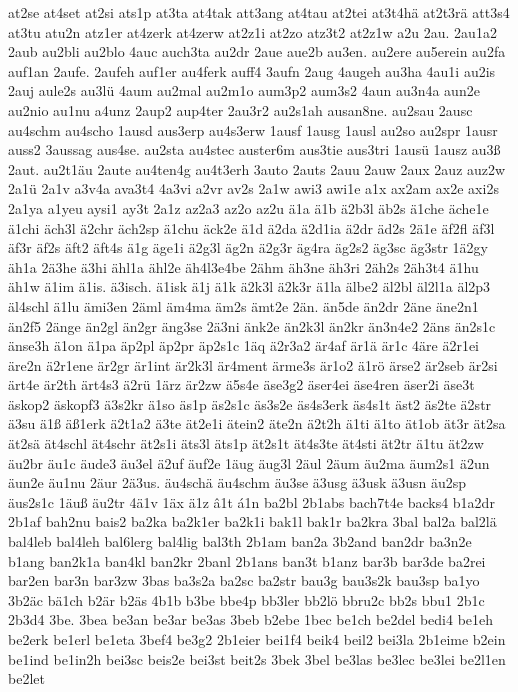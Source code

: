 {at2se
at4set
at2si
ats1p
at3ta
at4tak
att3ang
at4tau
at2tei
at3t4hä
at2t3rä
att3s4
at3tu
atu2n
atz1er
at4zerk
at4zerw
at2z1i
at2zo
atz3t2
at2z1w
a2u
2au.
2au1a2
2aub
au2bli
au2blo
4auc
auch3ta
au2dr
2aue
aue2b
au3en.
au2ere
au5erein
au2fa
auf1an
2aufe.
2aufeh
auf1er
au4ferk
auff4
3aufn
2aug
4augeh
au3ha
4au1i
au2is
2auj
aule2s
au3lü
4aum
au2mal
au2m1o
aum3p2
aum3s2
4aun
au3n4a
aun2e
au2nio
au1nu
a4unz
2aup2
aup4ter
2au3r2
au2s1ah
ausan8ne.
au2sau
2ausc
au4schm
au4scho
1ausd
aus3erp
au4s3erw
1ausf
1ausg
1ausl
au2so
au2spr
1ausr
auss2
3aussag
aus4se.
au2sta
au4stec
auster6m
aus3tie
aus3tri
1ausü
1ausz
au3ß
2aut.
au2t1äu
2aute
au4ten4g
au4t3erh
3auto
2auts
2auu
2auw
2aux
2auz
auz2w
2a1ü
2a1v
a3v4a
ava3t4
4a3vi
a2vr
av2s
2a1w
awi3
awi1e
a1x
ax2am
ax2e
axi2s
2a1ya
a1yeu
aysi1
ay3t
2a1z
az2a3
az2o
az2u
ä1a
ä1b
ä2b3l
äb2s
ä1che
äche1e
ä1chi
äch3l
ä2chr
äch2sp
ä1chu
äck2e
ä1d
ä2da
ä2d1ia
ä2dr
äd2s
2ä1e
äf2fl
äf3l
äf3r
äf2s
äft2
äft4s
ä1g
äge1i
ä2g3l
äg2n
ä2g3r
äg4ra
äg2s2
äg3sc
äg3str
1ä2gy
äh1a
2ä3he
ä3hi
ähl1a
ähl2e
äh4l3e4be
2ähm
äh3ne
äh3ri
2äh2s
2äh3t4
ä1hu
äh1w
ä1im
ä1is.
ä3isch.
ä1isk
ä1j
ä1k
ä2k3l
ä2k3r
ä1la
älbe2
äl2bl
äl2l1a
äl2p3
äl4schl
ä1lu
ämi3en
2äml
äm4ma
äm2s
ämt2e
2än.
än5de
än2dr
2äne
äne2n1
än2f5
2änge
än2gl
än2gr
äng3se
2ä3ni
änk2e
än2k3l
än2kr
än3n4e2
2äns
än2s1c
änse3h
ä1on
ä1pa
äp2pl
äp2pr
äp2s1c
1äq
ä2r3a2
är4af
är1ä
är1c
4äre
ä2r1ei
äre2n
ä2r1ene
är2gr
är1int
är2k3l
är4ment
ärme3s
är1o2
ä1rö
ärse2
är2seb
är2si
ärt4e
är2th
ärt4s3
ä2rü
1ärz
är2zw
ä5s4e
äse3g2
äser4ei
äse4ren
äser2i
äse3t
äskop2
äskopf3
ä3s2kr
ä1so
äs1p
äs2s1c
äs3s2e
äs4s3erk
äs4s1t
äst2
äs2te
ä2str
ä3su
ä1ß
äß1erk
ä2t1a2
ä3te
ät2e1i
ätein2
äte2n
ä2t2h
ä1ti
ä1to
ät1ob
ät3r
ät2sa
ät2sä
ät4schl
ät4schr
ät2s1i
äts3l
äts1p
ät2s1t
ät4s3te
ät4sti
ät2tr
ä1tu
ät2zw
äu2br
äu1c
äude3
äu3el
ä2uf
äuf2e
1äug
äug3l
2äul
2äum
äu2ma
äum2s1
ä2un
äun2e
äu1nu
2äur
2ä3us.
äu4schä
äu4schm
äu3se
ä3usg
ä3usk
ä3usn
äu2sp
äus2s1c
1äuß
äu2tr
4ä1v
1äx
ä1z
â1t
á1n
ba2bl
2b1abs
bach7t4e
backs4
b1a2dr
2b1af
bah2nu
bais2
ba2ka
ba2k1er
ba2k1i
bak1l
bak1r
ba2kra
3bal
bal2a
bal2lä
bal4leb
bal4leh
bal6lerg
bal4lig
bal3th
2b1am
ban2a
3b2and
ban2dr
ba3n2e
b1ang
ban2k1a
ban4kl
ban2kr
2banl
2b1ans
ban3t
b1anz
bar3b
bar3de
ba2rei
bar2en
bar3n
bar3zw
3bas
ba3s2a
ba2sc
ba2str
bau3g
bau3s2k
bau3sp
ba1yo
3b2äc
bä1ch
b2är
b2äs
4b1b
b3be
bbe4p
bb3ler
bb2lö
bbru2c
bb2s
bbu1
2b1c
2b3d4
3be.
3bea
be3an
be3ar
be3as
3beb
b2ebe
1bec
be1ch
be2del
bedi4
be1eh
be2erk
be1erl
be1eta
3bef4
be3g2
2b1eier
bei1f4
beik4
beil2
bei3la
2b1eime
b2ein
be1ind
be1in2h
bei3sc
beis2e
bei3st
beit2s
3bek
3bel
be3las
be3lec
be3lei
be2l1en
be2let
}
